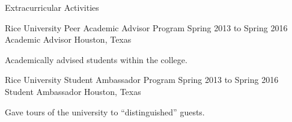 \documentclass{resume}
\begin{document}
\begin{rSection}{Extracurricular Activities}
{    \begin{rSubSection}
    {Rice University Peer Academic Advisor Program}
    {Spring 2013 to Spring 2016}
    {Academic Advisor}
    {Houston, Texas}%
    \item Academically advised students within the college.
    \end{rSubSection}

    \begin{rSubSection}
    {Rice University Student Ambassador Program}
    {Spring 2013 to Spring 2016}
    {Student Ambassador}
    {Houston, Texas}%
    \item Gave tours of the university to ``distinguished'' guests.
    \end{rSubSection}

  }{}

\end{rSection}





\iftoggle{cv}{

  \begin{rSection}{Awards And Honors}

  \Event{Max Kade Travel Grant}{Summer 2018} \\
  \Event{Brandeis GSAS Scholarship Grant}{Fall 2017} \\
  \Event{Sid Richardson Athenian Award}{Spring 2016} \\
  \Event{Rice Alumni Pride Award}{Fall 2015} \\
  \Event{President's Honor Roll}{Fall 2014, Fall 2015} \\
  \Event{John and Harriet Millington Scholarship}{Fall 2014, Fall 2015} \\
  \Event{Lon Wilson Service Award}{Spring 2015} \\
  \Event{Genevieve Parkhill Lykes Scholarship}{Fall 2014} \\
  \Event{Bracht-Verlander Scholarship}{Fall 2012} \\
  \Event{National Merit Quarterfinalist}{Spring 2012} \\
  \Event{AP Scholar with Honor}{Spring 2012} \\
  \Event{National Honor Society}{2011 to 2012}

  \end{rSection}

}{
  
  \begin{rSection}{Additional Information}

    For additional details about the information listed above, as well as information \\
    about my pertinent coursework, awards and honors, standardized test scores, etc, \\
    my full CV (Curriculum Vitae) is available online at \{www.nicholashh.com/cv\}.

  \end{rSection}

}
\end{document}
